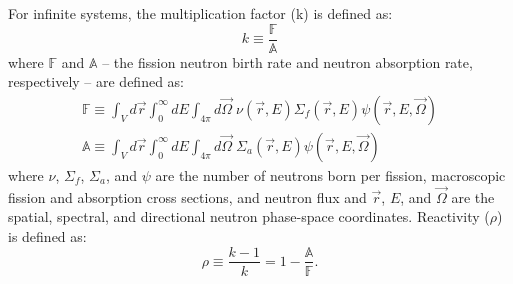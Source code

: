 \documentclass[11pt]{article}
\newcommand{\A}[0]{\mathbb{A}}
\newcommand{\F}[0]{\mathbb{F}}
\begin{document}
For infinite systems, the multiplication factor (k) is defined as:
\begin{equation}
    k\equiv \frac{\F}{\A}
\end{equation}
where $\F$ and $\A$ -- the fission neutron birth rate and neutron absorption rate, respectively -- are defined as:
\begin{equation}
    \begin{split}
    \F \equiv \int_V d\vec{r} \int_0^\infty dE \int_{4\pi} d\vec\Omega \; \nu(\vec r, E) \Sigma_f(\vec r, E) \psi(\vec r, E, \vec\Omega) \\
    \A \equiv \int_V d\vec{r} \int_0^\infty dE \int_{4\pi} d\vec\Omega \; \Sigma_a(\vec r, E) \psi(\vec r, E, \vec\Omega)
    \end{split}
\end{equation}
where $\nu$, $\Sigma_f$, $\Sigma_a$, and $\psi$ are the number of neutrons born per fission, macroscopic fission and absorption cross sections, and neutron flux and $\vec r$, $E$, and $\vec\Omega$ are the spatial, spectral, and directional neutron phase-space coordinates.
Reactivity ($\rho$) is defined as:
\begin{equation}
    \rho \equiv \frac{k-1}{k} = 1-\frac{\A}{\F}.
\end{equation}
\end{document}
